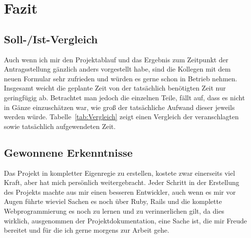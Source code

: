 \section{Fazit} 
\label{sec:Fazit}

\subsection{Soll-/Ist-Vergleich}
\label{sec:SollIstVergleich}
Auch wenn ich mir den Projektablauf und das Ergebnis zum Zeitpunkt der Antragsstellung gänzlich anders vorgestellt habe, sind die Kollegen mit dem neuen Formular sehr zufrieden und würden es gerne schon in Betrieb nehmen.\\
Insgesamt weicht die geplante Zeit von der tatsächlich benötigten Zeit nur geringfügig ab. Betrachtet man jedoch die einzelnen Teile, fällt auf, dass es nicht in Gänze einzuschätzen war, wie groß der tatsächliche Aufwand dieser jeweils werden würde. Tabelle~\ref{tab:Vergleich} zeigt einen Vergleich der veranschlagten sowie tatsächlich aufgewendeten Zeit.


\subsection{Gewonnene Erkenntnisse}
\label{sec:LessonsLearned}
Das Projekt in kompletter Eigenregie zu erstellen, kostete zwar einerseits viel Kraft, aber hat mich persönlich weitergebracht. Jeder Schritt in der Erstellung des Projekts machte aus mir einen besseren Entwickler, auch wenn es mir vor Augen führte wieviel Sachen es noch über \acs{Ruby}, \acs{Rails} und die komplette Webprogrammierung es noch zu lernen und zu verinnerlichen gilt, da dies wirklich, ausgenommen der Projektdokumentation, eine Sache ist, die mir Freude bereitet und für die ich gerne morgens zur Arbeit gehe.

